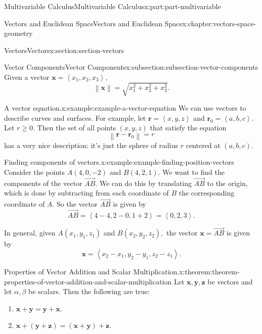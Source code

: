 \documentclass[twoside,10pt,]{tufte-book}
\numberwithin{equation}{part}
\newcommand{\norm}[1]{\left\| #1 \right\|}
\newcommand{\dotprod}[1]{\left\langle #1 \right\rangle}
\begin{document}
\begin{partptx}{Multivariable Calculus}{}{Multivariable Calculus}{}{}{x:part:part-multivariable}
\begin{chapterptx}{Vectors and Euclidean Space}{}{Vectors and Euclidean Space}{}{}{x:chapter:vectors-space-geometry}
\begin{sectionptx}{Vectors}{}{Vectors}{}{}{x:section:section-vectors}
\begin{subsectionptx}{Vector Components}{}{Vector Components}{}{}{x:subsection:subsection-vector-components}
Given a vector \(\mathbf{x} = \dotprod{x_{1},x_{2},x_{3}},\)%
\begin{equation*}
\norm{\mathbf{x}} = \sqrt{x_{1}^{2}+x_{2}^{2}+x_{3}^{2}}.
\end{equation*}
%
\begin{example}{A vector equation.}{x:example:example-a-vector-equation}%
We can use vectors to describe curves and surfaces. For example, let \(\mathbf{r} = \dotprod{x,y,z}\) and \(\mathbf{r}_{0} = \dotprod{a,b,c}\). Let \(r\geq0\). Then the set of all points \((x,y,z)\) that satisfy the equation%
\begin{equation*}
\norm{\mathbf{r}-\mathbf{r}_{0}} = r
\end{equation*}
has a very nice description: it's just the sphere of radius \(r\) centered at \((a,b,c)\).%
\end{example}
\begin{example}{Finding components of vectors.}{x:example:example-finding-position-vectors}%
Consider the points \(A(4,0,-2)\) and \(B(4,2,1)\). We want to find the components of the vector \(\overrightarrow{AB}\). We can do this by translating \(\overrightarrow{AB}\) to the origin, which is done by subtracting from each coordinate of \(B\) the corresponding coordinate of \(A\). So the vector \(\overrightarrow{AB}\) is given by%
%
\begin{equation*}
\overrightarrow{AB} = \dotprod{4-4,2-0,1+2} = \dotprod{0,2,3}.
\end{equation*}
\end{example}
In general, given \(A(x_{1},y_{1},z_{1})\) and \(B(x_{2},y_{2},z_{2}),\) the vector \(\mathbf{x} = \overrightarrow{AB}\) is given by%
%
\begin{equation*}
\mathbf{x} = \dotprod{x_{2}-x_{1},y_{2}-y_{1},z_{2}-z_{1}}.
\end{equation*}
\begin{theorem}{Properties of Vector Addition and Scalar Multiplication.}{}{x:theorem:theorem-properties-of-vector-addition-and-scalar-multiplication}%
%
Let \(\mathbf{x},\mathbf{y},\mathbf{z}\) be vectors and let \(\alpha,\beta\) be scalars. Then the following are true:%
%
\begin{multicols}{2}
\begin{enumerate}
\item{}\(\mathbf{x}+\mathbf{y} = \mathbf{y}+\mathbf{x}\).%
\item{}\(\displaystyle \mathbf{x}+(\mathbf{y}+\mathbf{z}) = (\mathbf{x}+\mathbf{y})+\mathbf{z}.\)%

\end{enumerate}
\end{multicols}
\end{theorem}
\end{subsectionptx}
\end{sectionptx}
\end{chapterptx}
\end{partptx}
\end{document}
